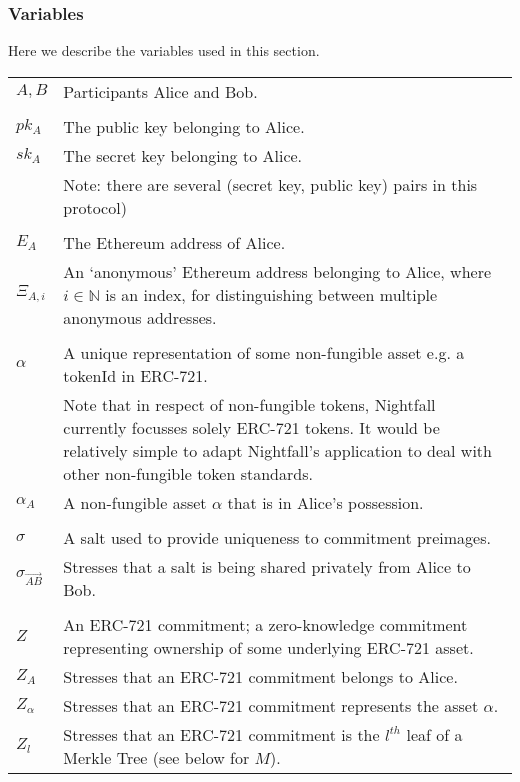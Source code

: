 \subsubsection{Variables}
Here we describe the variables used in this section. 

\begin{center}
	\begin{tabular}{lp{14cm}}
    $A, B$      & Participants Alice and Bob.\\
    \\
    $pk_A$      & The public key belonging to Alice.\\
    $sk_A$      & The secret key belonging to Alice.\\
                & Note: there are several (secret key, public key) pairs in this protocol)\\
    \\
		$E_A$       & The Ethereum address of Alice.\\
		$\Xi_{A,i}$ & An `anonymous' Ethereum address belonging to Alice, where $i\in\mathbb{N}$ is an index, for distinguishing between multiple anonymous addresses. \\
    \\
    $\alpha$    & A unique representation of some non-fungible asset e.g. a tokenId in ERC-721.\\
                & Note that in respect of non-fungible tokens, Nightfall currently focusses solely ERC-721 tokens.
                  It would be relatively simple to adapt Nightfall's application to deal with other non-fungible token standards.\\
    $\alpha_A$  & A non-fungible asset $\alpha$ that is in Alice's possession. \\
    \\
		$\sigma$      & A salt used to provide uniqueness to commitment preimages.\\
		$\sigma_{\vec{AB}}$ & Stresses that a salt is being shared privately from Alice to Bob.\\
    \\
		$Z$         & An ERC-721 commitment; a zero-knowledge commitment representing ownership of some underlying ERC-721 asset. \\
    $Z_A$       & Stresses that an ERC-721 commitment belongs to Alice.\\
    $Z_{\alpha}$ & Stresses that an ERC-721 commitment represents the asset $\alpha$.\\
    $Z_{l}$     & Stresses that an ERC-721 commitment is the $l^{th}$ leaf of a Merkle Tree (see below for $M$).\\

\end{tabular}
\end{center}
